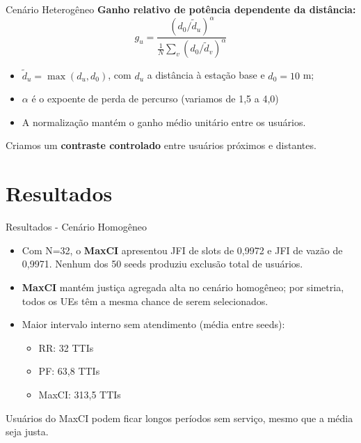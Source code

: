 \documentclass[noamsthm,notheorems,11pt,compress,fontset=windows]{beamer}
\numberwithin{figure}{section}
\numberwithin{table}{section}
\numberwithin{equation}{section}
\theoremstyle{plain} %
\begin{document}
\begin{frame}{Cenário Heterogêneo}
    \textbf{Ganho relativo de potência dependente da distância:}
    \[
    g_u = \frac{(d_0 / \tilde{d}_u)^\alpha}{\frac{1}{N} \sum_v (d_0 / \tilde{d}_v)^\alpha}
    \]

    \begin{itemize}
        \item \( \tilde d_u = \max(d_u, d_0) \), com \( d_u \) a distância à estação base e \( d_0 = 10 \) m;
        \item \( \alpha \) é o expoente de perda de percurso (variamos de 1,5 a 4,0)
        \item A normalização mantém o ganho médio unitário entre os usuários.
    \end{itemize} \par
    Criamos um \textbf{contraste controlado} entre usuários próximos e distantes.

\end{frame}


\section{Resultados}

\begin{frame}{Resultados - Cenário Homogêneo}

\begin{itemize}
    \item Com N=32, o \textbf{MaxCI} apresentou JFI de slots de 0,9972 e JFI de vazão de 0,9971. Nenhum dos 50 seeds produziu exclusão total de usuários.

    \item \textbf{MaxCI} mantém justiça agregada alta no cenário homogêneo; por simetria, todos os UEs têm a mesma chance de serem selecionados.

    \item Maior intervalo interno sem atendimento (média entre seeds):

        \begin{itemize}
            \item RR: 32 TTIs
            \item PF: 63,8 TTIs
            \item MaxCI: 313,5 TTIs
        \end{itemize}

\end{itemize}

    \begin{block}{} Usuários do MaxCI podem ficar longos períodos sem serviço, mesmo que a média seja justa.
    \end{block}

\end{frame}
\end{document}
